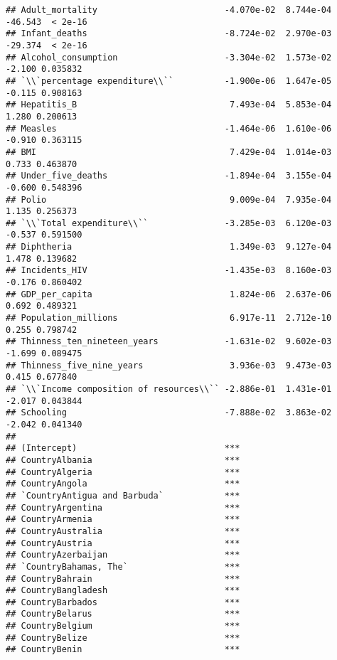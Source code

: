 \documentclass[
]{article}
\begin{document}
\begin{verbatim}
## Adult_mortality                         -4.070e-02  8.744e-04 -46.543  < 2e-16
## Infant_deaths                           -8.724e-02  2.970e-03 -29.374  < 2e-16
## Alcohol_consumption                     -3.304e-02  1.573e-02  -2.100 0.035832
## `\\`percentage expenditure\\``          -1.900e-06  1.647e-05  -0.115 0.908163
## Hepatitis_B                              7.493e-04  5.853e-04   1.280 0.200613
## Measles                                 -1.464e-06  1.610e-06  -0.910 0.363115
## BMI                                      7.429e-04  1.014e-03   0.733 0.463870
## Under_five_deaths                       -1.894e-04  3.155e-04  -0.600 0.548396
## Polio                                    9.009e-04  7.935e-04   1.135 0.256373
## `\\`Total expenditure\\``               -3.285e-03  6.120e-03  -0.537 0.591500
## Diphtheria                               1.349e-03  9.127e-04   1.478 0.139682
## Incidents_HIV                           -1.435e-03  8.160e-03  -0.176 0.860402
## GDP_per_capita                           1.824e-06  2.637e-06   0.692 0.489321
## Population_millions                      6.917e-11  2.712e-10   0.255 0.798742
## Thinness_ten_nineteen_years             -1.631e-02  9.602e-03  -1.699 0.089475
## Thinness_five_nine_years                 3.936e-03  9.473e-03   0.415 0.677840
## `\\`Income composition of resources\\`` -2.886e-01  1.431e-01  -2.017 0.043844
## Schooling                               -7.888e-02  3.863e-02  -2.042 0.041340
##                                            
## (Intercept)                             ***
## CountryAlbania                          ***
## CountryAlgeria                          ***
## CountryAngola                           ***
## `CountryAntigua and Barbuda`            ***
## CountryArgentina                        ***
## CountryArmenia                          ***
## CountryAustralia                        ***
## CountryAustria                          ***
## CountryAzerbaijan                       ***
## `CountryBahamas, The`                   ***
## CountryBahrain                          ***
## CountryBangladesh                       ***
## CountryBarbados                         ***
## CountryBelarus                          ***
## CountryBelgium                          ***
## CountryBelize                           ***
## CountryBenin                            ***

\end{verbatim}
\end{document}
